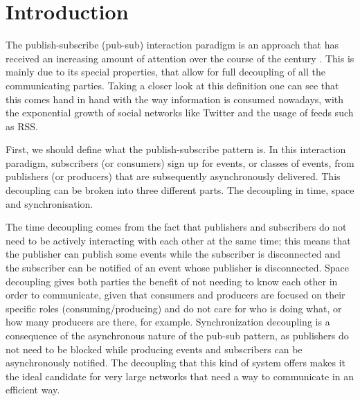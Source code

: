 
\section{Introduction}\label{section:introduction}

The publish-subscribe (pub-sub) interaction paradigm is an approach that has
received an increasing amount of attention over the course of the century
\cite{Kermarrec2013} \cite{Eugster2003}.  This is mainly due to its special
properties, that allow for full decoupling of all the communicating parties.
Taking a closer look at this definition one can see that this comes hand in
hand with the way information is consumed nowadays, with the exponential growth
of social networks like Twitter and the usage of feeds such as RSS.

First, we should define what the publish-subscribe pattern is.  In this
interaction paradigm, subscribers (or consumers) sign up for events, or classes
of events, from publishers (or producers) that are subsequently asynchronously
delivered. This decoupling can be broken into three different parts. The
decoupling in time, space and synchronisation.

The time decoupling comes from the fact that publishers and subscribers do not
need to be actively interacting with each other at the same time; this means
that the publisher can publish some events while the subscriber is disconnected
and the subscriber can be notified of an event whose publisher is disconnected.
Space decoupling gives both parties the benefit of not needing to know each
other in order to communicate, given that consumers and producers are focused
on their specific roles (consuming/producing) and do not care for who is doing
what, or how many producers are there, for example. Synchronization decoupling
is a consequence of the asynchronous nature of the pub-sub pattern, as
publishers do not need to be blocked while producing events and subscribers can
be asynchronously notified.  The decoupling that this kind of system offers
makes it the ideal candidate for very large networks that need a way to
communicate in an efficient way.

